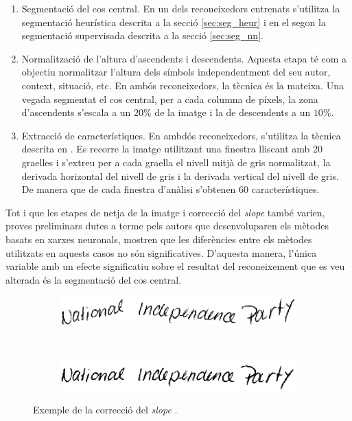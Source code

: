 \begin{enumerate}
\item Segmentació del cos central. En un dels reconeixedors entrenats s'utilitza la segmentació heurística descrita a la secció \ref{sec:seg_heur} i en el segon la segmentació supervisada descrita a la secció \ref{sec:seg_nn}.

\item Normalització de l'altura d'ascendents i descendents. Aquesta etapa té com a objectiu normalitzar l'altura dels símbols independentment del seu autor, context, situació, etc. En ambós reconeixedors, la tècnica és la mateixa. Una vegada segmentat el cos central, per a cada columna de píxels, la zona d'ascendents s'escala a un $20\%$ de la imatge i la de descendents a un $10\%$.

\item Extracció de característiques. En ambdós reconeixedors, s'utilitza la tècnica descrita en \cite{toselli2004integrated,Pastor07}. Es recorre la imatge utilitzant una finestra lliscant amb 20 graelles i s'extreu per a cada graella el nivell mitjà de gris normalitzat, la derivada horizontal del nivell de gris i la derivada vertical del nivell de gris. De manera que de cada finestra d'anàlisi s'obtenen 60 característiques.
\end{enumerate}
Tot i que les etapes de netja de la imatge i correcció del \emph{slope} també varien, proves preliminars dutes a terme pels autors que desenvoluparen els mètodes basats en xarxes neuronals, mostren que les diferències entre els mètodes utilitzats en aquests casos no són significatives. D'aquesta manera, l'única variable amb un efecte significatiu sobre el resultat del reconeixement que es veu alterada és la segmentació del cos central.

\begin{figure}
\centering
\begin{subfigure}[b]{0.8\textwidth}
\centering
\includegraphics[width=\textwidth]{images/slope_orig.eps}
\caption{}\label{fig:slope_correction_orig}
\end{subfigure}\\
\begin{subfigure}[b]{0.8\textwidth}
\centering
\includegraphics[width=\textwidth]{images/slope_corr.eps}
\caption{}\label{fig:slope_correction_result}
\end{subfigure}
\caption{Exemple de la correcció del \emph{slope} \cite{Pastor07}.}\label{fig:slope_correction}
\end{figure}


